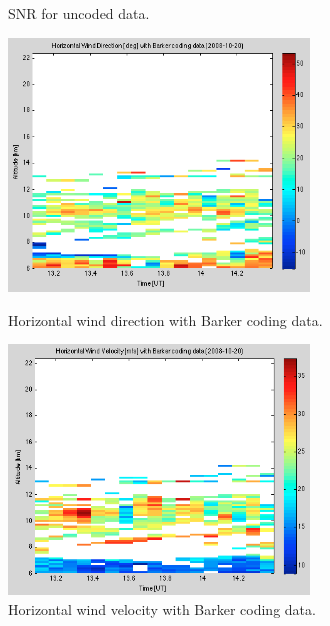 \documentclass{article}
\begin{document}
\begin{figure}[htb]
\begin{minipage}[b]{0.5\linewidth}
\caption{SNR for uncoded data.}
\label{fig:SNR_uncoded}
\end{minipage}
\end{figure}



\begin{figure}[htb]
\begin{minipage}[t]{0.5\linewidth}
\centering
\includegraphics[width=8cm]{Figures/wind_dir_barker.png}
\caption{Horizontal wind direction with Barker coding data.}
\label{fig:wind_dir_barker}
\end{minipage}
\begin{minipage}[t]{0.5\linewidth}
\centering
\includegraphics[width=8cm]{Figures/wind_vel_barker.png}
\caption{Horizontal wind velocity with Barker coding data.}
\label{fig:wind_vel_barker}
\end{minipage}
\end{figure}
\end{document}
